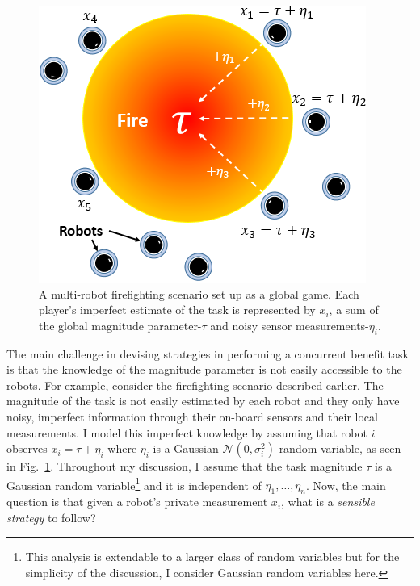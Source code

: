 \documentclass[defaultstyle,12pt]{proposal}
\begin{document}
\begin{figure}[!htb]
\centering\includegraphics[width=0.65\columnwidth]{../assets/globalgamesetup.png}
\centering\caption{A multi-robot firefighting scenario set up as a global game. Each player's imperfect estimate of the task is represented by $x_i$, a sum of the global magnitude parameter-$\tau$ and noisy sensor measurements-$\eta_i$.}\vspace{-10px}\label{fig:ggsetup}
\end{figure}

The main challenge in devising strategies in performing a concurrent benefit task is that the knowledge of the magnitude parameter is not easily accessible to the robots. For example, consider the firefighting scenario described earlier. The magnitude of the task is not easily estimated by each robot and they only have noisy, imperfect information through their on-board sensors and their local measurements.  I model this imperfect knowledge by assuming that robot $i$ observes $x_i=\tau+\eta_i$ where $\eta_i$ is a Gaussian $\mathcal{N}(0,\sigma_i^2)$ random variable, as seen in Fig.~\ref{fig:ggsetup}. Throughout my discussion, I assume that the task magnitude $\tau$ is a Gaussian random variable\footnote{This analysis is extendable to a larger class of random variables but for the simplicity of the discussion, I consider Gaussian random variables here.} and it is independent of $\eta_1,\ldots,\eta_n$. Now, the main question is that given a robot's private measurement $x_i$, what is a \emph{sensible strategy} to follow?
\end{document}
